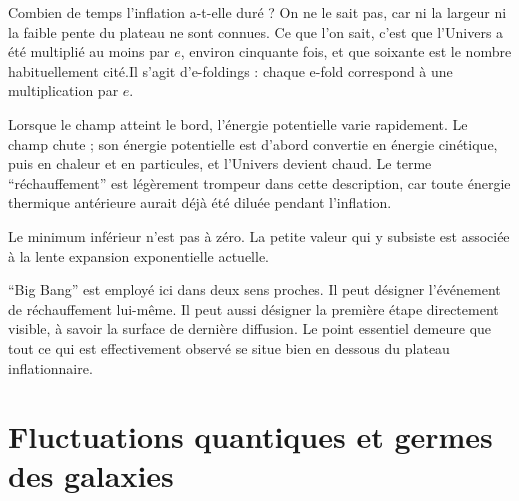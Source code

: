 Combien de temps l’inflation a-t-elle duré ? On ne le sait pas, car ni la largeur ni la faible pente du plateau ne sont connues. Ce que l’on sait, c’est que l’Univers a été multiplié au moins par \(e\), environ cinquante fois, et que soixante est le nombre habituellement cité.Il s’agit d’e-foldings : chaque e-fold correspond à une multiplication par \(e\).

Lorsque le champ atteint le bord, l’énergie potentielle varie rapidement. Le champ chute ; son énergie potentielle est d’abord convertie en énergie cinétique, puis en chaleur et en particules, et l’Univers devient chaud. Le terme ``réchauffement'' est légèrement trompeur dans cette description, car toute énergie thermique antérieure aurait déjà été diluée pendant l’inflation.

Le minimum inférieur n’est pas à zéro. La petite valeur qui y subsiste est associée à la lente expansion exponentielle actuelle.

\begin{classroomqa}
\end{classroomqa}

``Big Bang'' est employé ici dans deux sens proches. Il peut désigner l’événement de réchauffement lui-même. Il peut aussi désigner la première étape directement visible, à savoir la surface de dernière diffusion. Le point essentiel demeure que tout ce qui est effectivement observé se situe bien en dessous du plateau inflationnaire.

\begin{classroomqa}
\end{classroomqa}

\section{Fluctuations quantiques et germes des galaxies}

